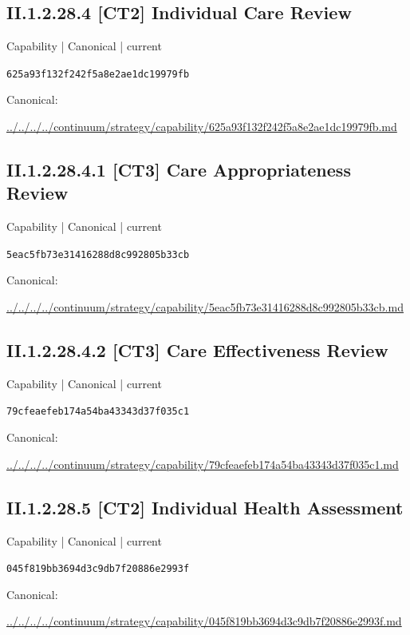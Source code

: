 \documentclass[10pt,a4paper]{article}
\begin{document}
\subsection*{II.1.2.28.4 [CT2] Individual Care Review}
{\small Capability | Canonical | current}\par
\texttt{625a93f132f242f5a8e2ae1dc19979fb}\par
Canonical: \par
{\footnotesize\url{../../../../continuum/strategy/capability/625a93f132f242f5a8e2ae1dc19979fb.md}}\par
\subsection*{II.1.2.28.4.1 [CT3] Care Appropriateness Review}
{\small Capability | Canonical | current}\par
\texttt{5eac5fb73e31416288d8c992805b33cb}\par
Canonical: \par
{\footnotesize\url{../../../../continuum/strategy/capability/5eac5fb73e31416288d8c992805b33cb.md}}\par
\subsection*{II.1.2.28.4.2 [CT3] Care Effectiveness Review}
{\small Capability | Canonical | current}\par
\texttt{79cfeaefeb174a54ba43343d37f035c1}\par
Canonical: \par
{\footnotesize\url{../../../../continuum/strategy/capability/79cfeaefeb174a54ba43343d37f035c1.md}}\par
\subsection*{II.1.2.28.5 [CT2] Individual Health Assessment}
{\small Capability | Canonical | current}\par
\texttt{045f819bb3694d3c9db7f20886e2993f}\par
Canonical: \par
{\footnotesize\url{../../../../continuum/strategy/capability/045f819bb3694d3c9db7f20886e2993f.md}}\par
\end{document}
